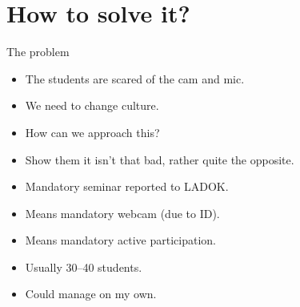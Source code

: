 \section{How to solve it?}

\begin{frame}
  \begin{block}{The problem}
    \begin{itemize}
      \item The students are scared of the cam and mic.
      \item We need to change culture.
    \end{itemize}
  \end{block}

  \begin{question}
    \begin{itemize}
      \item How can we approach this?
    \end{itemize}
  \end{question}
\end{frame}

\begin{frame}
  \begin{idea}
    \begin{itemize}
      \item Show them it isn't that bad, rather quite the opposite.
    \end{itemize}
  \end{idea}

  \pause

  \begin{solution}
    \begin{itemize}
      \item Mandatory seminar reported to LADOK.
      \item Means mandatory webcam (due to ID).
      \item Means mandatory active participation.
    \end{itemize}
  \end{solution}

  \begin{example}
    \begin{itemize}
      \item Usually 30--40 students.
      \item Could manage on my own.
    \end{itemize}
  \end{example}
\end{frame}

